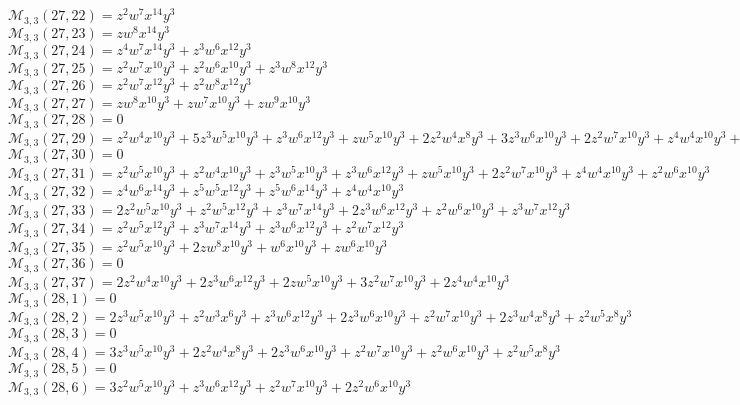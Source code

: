 $\mathcal{M}_{3,3}(27,22)=z^2w^7x^{14}y^3$\\
$\mathcal{M}_{3,3}(27,23)=zw^8x^{14}y^3$\\
$\mathcal{M}_{3,3}(27,24)=z^4w^7x^{14}y^3+z^3w^6x^{12}y^3$\\
$\mathcal{M}_{3,3}(27,25)=z^2w^7x^{10}y^3+z^2w^6x^{10}y^3+z^3w^8x^{12}y^3$\\
$\mathcal{M}_{3,3}(27,26)=z^2w^7x^{12}y^3+z^2w^8x^{12}y^3$\\
$\mathcal{M}_{3,3}(27,27)=zw^8x^{10}y^3+zw^7x^{10}y^3+zw^9x^{10}y^3$\\
$\mathcal{M}_{3,3}(27,28)=0$\\
$\mathcal{M}_{3,3}(27,29)=z^2w^4x^{10}y^3+5z^3w^5x^{10}y^3+z^3w^6x^{12}y^3+zw^5x^{10}y^3+2z^2w^4x^8y^3+3z^3w^6x^{10}y^3+2z^2w^7x^{10}y^3+z^4w^4x^{10}y^3+z^2w^5x^8y^3$\\
$\mathcal{M}_{3,3}(27,30)=0$\\
$\mathcal{M}_{3,3}(27,31)=z^2w^5x^{10}y^3+z^2w^4x^{10}y^3+z^3w^5x^{10}y^3+z^3w^6x^{12}y^3+zw^5x^{10}y^3+2z^2w^7x^{10}y^3+z^4w^4x^{10}y^3+z^2w^6x^{10}y^3$\\
$\mathcal{M}_{3,3}(27,32)=z^4w^6x^{14}y^3+z^5w^5x^{12}y^3+z^5w^6x^{14}y^3+z^4w^4x^{10}y^3$\\
$\mathcal{M}_{3,3}(27,33)=2z^2w^5x^{10}y^3+z^2w^5x^{12}y^3+z^3w^7x^{14}y^3+2z^3w^6x^{12}y^3+z^2w^6x^{10}y^3+z^3w^7x^{12}y^3$\\
$\mathcal{M}_{3,3}(27,34)=z^2w^5x^{12}y^3+z^3w^7x^{14}y^3+z^3w^6x^{12}y^3+z^2w^7x^{12}y^3$\\
$\mathcal{M}_{3,3}(27,35)=z^2w^5x^{10}y^3+2zw^8x^{10}y^3+w^6x^{10}y^3+zw^6x^{10}y^3$\\
$\mathcal{M}_{3,3}(27,36)=0$\\
$\mathcal{M}_{3,3}(27,37)=2z^2w^4x^{10}y^3+2z^3w^6x^{12}y^3+2zw^5x^{10}y^3+3z^2w^7x^{10}y^3+2z^4w^4x^{10}y^3$\\
$\mathcal{M}_{3,3}(28,1)=0$\\
$\mathcal{M}_{3,3}(28,2)=2z^3w^5x^{10}y^3+z^2w^3x^6y^3+z^3w^6x^{12}y^3+2z^3w^6x^{10}y^3+z^2w^7x^{10}y^3+2z^3w^4x^8y^3+z^2w^5x^8y^3$\\
$\mathcal{M}_{3,3}(28,3)=0$\\
$\mathcal{M}_{3,3}(28,4)=3z^3w^5x^{10}y^3+2z^2w^4x^8y^3+2z^3w^6x^{10}y^3+z^2w^7x^{10}y^3+z^2w^6x^{10}y^3+z^2w^5x^8y^3$\\
$\mathcal{M}_{3,3}(28,5)=0$\\
$\mathcal{M}_{3,3}(28,6)=3z^2w^5x^{10}y^3+z^3w^6x^{12}y^3+z^2w^7x^{10}y^3+2z^2w^6x^{10}y^3$\\
